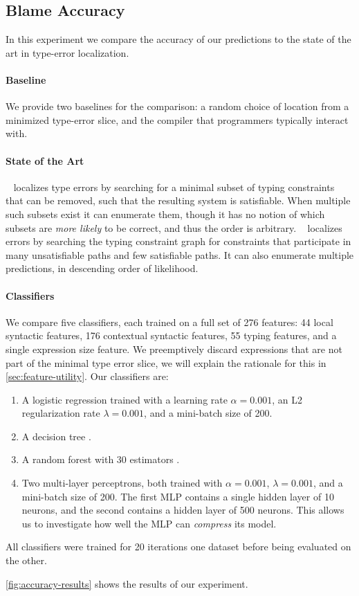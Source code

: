 \subsection{Blame Accuracy}
\label{sec:quantitative}

In this experiment we compare the accuracy of our predictions to the
state of the art in type-error localization.

\paragraph{Baseline}
We provide two baselines for the comparison: a random choice of location
from a minimized type-error slice, and the \ocaml compiler that
programmers typically interact with.

\paragraph{State of the Art}
\mycroft~\citep{Loncaric2016-uk} localizes type errors by searching for
a minimal subset of typing constraints that can be removed, such that
the resulting system is satisfiable.
%
When multiple such subsets exist it can enumerate them, though it has no
notion of which subsets are \emph{more likely} to be correct, and thus
the order is arbitrary.
%
\sherrloc~\citep{Zhang2014-lv} localizes errors by searching the typing
constraint graph for constraints that participate in many unsatisfiable
paths and few satisfiable paths.
%
It can also enumerate multiple predictions, in descending order of
likelihood.

\paragraph{Classifiers}
We compare five classifiers, each trained on a full set of 276 features:
44 local syntactic features, 176 contextual syntactic features, 55
typing features, and a single expression size feature.
%
%
We preemptively discard expressions that are not part of the minimal
type error slice, we will explain the rationale for this in
\autoref{sec:feature-utility}.
%
Our classifiers are:
%
\begin{enumerate}
\item A logistic regression trained with a learning rate
  $\alpha = 0.001$, an L2 regularization rate $\lambda = 0.001$, and a
  mini-batch size of 200.
\item A decision tree .
\item A random forest with 30 estimators .
\item Two multi-layer perceptrons, both trained with $\alpha = 0.001$,
  $\lambda = 0.001$, and a mini-batch size of 200. The first MLP
  contains a single hidden layer of 10 neurons, and the second contains
  a hidden layer of 500 neurons. This allows us to investigate how well
  the MLP can \emph{compress} its model.
\end{enumerate}
%
All classifiers were trained for 20 iterations one dataset before being
evaluated on the other.



\autoref{fig:accuracy-results} shows the results of our experiment.

